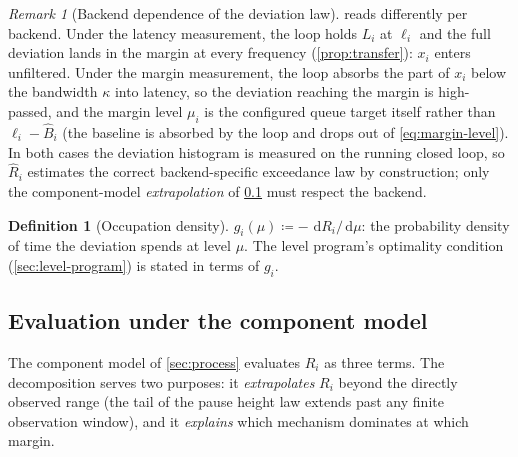 \documentclass[11pt, a4paper]{article}
\theoremstyle{definition}
\newtheorem{definition}{Definition}[section]
\theoremstyle{plain}
\theoremstyle{remark}
\newtheorem{remark}{Remark}[section]
\newcommand{\dd}{\,\mathrm{d}}
\begin{document}
\begin{remark}[Backend dependence of the deviation law]
\label{rem:backend-deviation}
 reads differently per backend.  Under the
latency measurement, the loop holds $L_i$ at $\ell_i$ and the full
deviation lands in the margin at every frequency
(\cref{prop:transfer}): $x_i$ enters unfiltered.  Under the margin
measurement, the loop absorbs the part of $x_i$ below the bandwidth
$\kappa$ into latency, so the deviation reaching the margin is
high-passed, and the margin level $\mu_i$ is the configured queue
target itself rather than $\ell_i - \hat B_i$ (the baseline is
absorbed by the loop and drops out of \cref{eq:margin-level}).  In
both cases the deviation histogram is measured on the running closed
loop, so $\hat R_i$ estimates the correct backend-specific exceedance
law by construction; only the component-model \emph{extrapolation} of
\cref{sec:risk-evaluation} must respect the backend.
\end{remark}

\begin{definition}[Occupation density]\label{def:occupation}
$g_i(\mu) \coloneqq -\,\dd R_i/\dd\mu$: the probability density of time
the deviation spends at level $\mu$.  The level program's optimality
condition (\cref{sec:level-program}) is stated in terms of $g_i$.
\end{definition}

\subsection{Evaluation under the component model}\label{sec:risk-evaluation}

The component model of \cref{sec:process} evaluates $R_i$ as three
terms.  The decomposition serves two purposes: it \emph{extrapolates}
$R_i$ beyond the directly observed range (the tail of the pause height
law extends past any finite observation window), and it \emph{explains}
which mechanism dominates at which margin.
\end{document}
